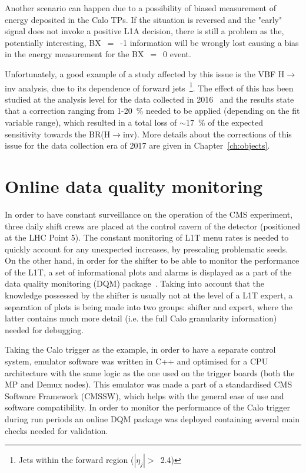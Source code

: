 \hspace{10pt} Another scenario can happen due to a possibility of biased measurement of energy deposited in the Calo TPs. If the situation is reversed and the "early" signal does not invoke a positive L1A decision, there is still a problem as the, potentially interesting, BX~$=$~-1 information will be wrongly lost causing a bias in the energy measurement for the BX~$=$~0 event. 

\hspace{10pt} Unfortunately, a good example of a study affected by this issue is the VBF H$\rightarrow$inv analysis, due to its dependence of forward jets~\footnote{Jets within the forward region ($|\eta_j|>$~2.4)}. The effect of this has been studied at the analysis level for the data collected in 2016~\cite{paper:HIG_17_023} and the results state that a correction ranging from 1-20~\% needed to be applied (depending on the fit variable range), which resulted in a total loss of $\sim$17~\% of the expected sensitivity towards the BR(H$\rightarrow$inv). More details about the corrections of this issue for the data collection era of 2017 are given in Chapter~\ref{ch:objects}.


\section{Online data quality monitoring}
\hspace{10pt} In order to have constant surveillance on the operation of the CMS experiment, three daily shift crews are placed at the control cavern of the detector (positioned at the LHC Point 5). The constant monitoring of L1T menu rates is needed to quickly account for any unexpected increases, by prescaling problematic seeds. On the other hand, in order for the shifter to be able to monitor the performance of the L1T, a set of informational plots and alarms is displayed as a part of the data quality monitoring (DQM) package~\cite{Antoni}. Taking into account that the knowledge possessed by the shifter is usually not at the level of a L1T expert, a separation of plots is being made into two groups: shifter and expert, where the latter contains much more detail (i.e. the full Calo granularity information) needed for debugging.

\hspace{10pt} Taking the Calo trigger as the example, in order to have a separate control system, emulator software was written in C++ and optimised for a CPU architecture with the same logic as the one used on the trigger boards (both the MP and Demux nodes). This emulator was made a part of a standardised CMS Software Framework (CMSSW), which helps with the general ease of use and software compatibility. In order to monitor the performance of the Calo trigger during run periods an online DQM package was deployed containing several main checks needed for validation. 

